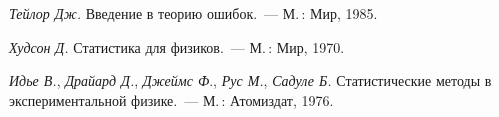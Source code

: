 \begin{booksupplement}
\begin{lab:literature}
    \item \textit{Тейлор Дж.} Введение в теорию ошибок.~---
    М.\,: Мир, 1985.
%    
%    
    
    \item \textit{Худсон Д.} Статистика для физиков.~---
    М.\,: Мир, 1970.
    
    \item \textit{Идье В.}, \textit{Драйард Д.}, \textit{Джеймс Ф}., \textit{Рус М.}, \textit{Садуле Б.} 
    Статистические методы в экспериментальной физике.~---
    М.\,: Атомиздат, 1976. 
\end{lab:literature}

\end{booksupplement}